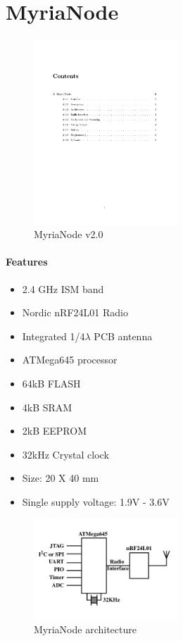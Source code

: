 \documentclass[a4paper,10pt]{report}
\begin{document}
\chapter{MyriaNode}
\begin{figure}
  \begin{center}
    \includegraphics[width=0.48\textwidth]{myrianode}
  \end{center}
  \caption{MyriaNode v2.0}
\end{figure}
\subsubsection{Features}
\begin{itemize}
 \item 2.4 GHz ISM band
 \item Nordic nRF24L01 Radio
 \item Integrated 1/4$\lambda$ PCB antenna
 \item ATMega645 processor
 \item 64kB FLASH
 \item 4kB SRAM
 \item 2kB EEPROM
 \item 32kHz Crystal clock
 \item Size: 20 X 40 mm
 \item Single supply voltage: 1.9V - 3.6V
\end{itemize}
\begin{figure}
\vspace{-40pt}
  \begin{center}
    \includegraphics[width=0.48\textwidth]{myrianodearch}
  \end{center}
  \caption{MyriaNode architecture}
  \label{myrianodearch}
\end{figure}
\end{document}
